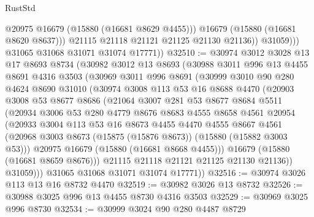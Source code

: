 \begin{lexlean}{RustStd}
\begin{coremodule}
                      @20975
                      @16679
                      (@15880 (@16681 @8629 @4455)))
                    @16679
                    (@15880 (@16681 @8620 @8637)))
                  @21115
                  @21118
                  @21121
                  @21125
                  @21130
                  @21136))
              @31059)))
        @31065
        @31068
        @31071
        @31074
        @17771))
@32510 := @30974
    @3012
    @3028
    @13
    @17
    @8693
    @8734
    (@30982
      @3012
      @13
      @8693
      (@30988
        @3011
        @996
        @13
        @4455
        @8691
        @4316
        @3503
        (@30969
          @3011
          @996
          @8691
          (@30999
            @3010
            @90
            @280
            @4624
            @8690
            @31010
            (@30974
              @3008
              @113
              @53
              @16
              @8688
              @4470
              (@20903
                @3008
                @53
                @8677
                @8686
                (@21064
                  @3007
                  @281
                  @53
                  @8677
                  @8684
                  @5511
                  (@20934
                    @3006
                    @53
                    @280
                    @4779
                    @8676
                    @8683
                    @4555
                    @8658
                    @4561
                    @20954
                    (@20933
                      @3004
                      @113
                      @53
                      @16
                      @8673
                      @4455
                      @4470
                      @4555
                      @8667
                      @4561
                      (@20968 @3003 @8673 (@15875 (@15876 @8673)) (@15880 (@15882 @3003 @53)))
                      @20975
                      @16679
                      (@15880 (@16681 @8668 @4455)))
                    @16679
                    (@15880 (@16681 @8659 @8676)))
                  @21115
                  @21118
                  @21121
                  @21125
                  @21130
                  @21136))
              @31059)))
        @31065
        @31068
        @31071
        @31074
        @17771))
@32516 := @30974 @3026 @113 @13 @16 @8732 @4470
@32519 := @30982 @3026 @13 @8732
@32526 := @30988 @3025 @996 @13 @4455 @8730 @4316 @3503
@32529 := @30969 @3025 @996 @8730
@32534 := @30999 @3024 @90 @280 @4487 @8729

\end{coremodule}
\end{lexlean}
